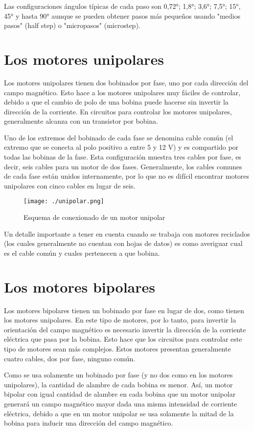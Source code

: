 \documentclass[final,narroweqnarray,inline,twoside]{ieee}
\begin{document}
Las configuraciones ángulos típicas de cada paso son 0,72°; 1,8°; 3,6°; 7,5°; 15°, 45° y hasta 90° aunque se pueden obtener
pasos más pequeños usando "medios pasos" (half step) o "micropasos" (microstep).

\section{Los motores unipolares}
Los motores unipolares tienen dos bobinados por fase, uno por cada dirección del campo magnético. Esto hace a los motores
unipolares muy fáciles de controlar, debido a que el cambio de polo de una bobina puede hacerse sin invertir la dirección de
la corriente. En circuitos para controlar los motores unipolares, generalmente alcanza con un transistor por bobina.

Uno de los extremos del bobinado de cada fase se denomina cable común (el extremo que se conecta al
polo positivo a entre 5 y 12 V) y es compartido por todas las bobinas de la fase. Esta configuración muestra tres cables por
fase, es decir, seis cables para un motor de dos fases. Generalmente, los cables comunes de cada fase están unidos
internamente, por lo que no es difícil encontrar motores unipolares con cinco cables en lugar de seis.
\begin{figure}[h]
 \centering
 \texttt{[image: ./unipolar.png]}
 \caption{Esquema de conexionado de un motor unipolar}
 \label{fig: Esquema de conexionado de un motor unipolar}
\end{figure}

Un detalle importante a tener en cuenta cuando se trabaja con motores reciclados (los cuales generalmente no cuentan con
hojas de datos) es como averiguar cual es el cable común y cuales pertenecen a que bobina.

\section{Los motores bipolares}
Los motores bipolares tienen un bobinado por fase en lugar de dos, como tienen los motores unipolares. En este tipo de
motores, por lo tanto, para invertir la orientación del campo magnético es necesario invertir la dirección de la corriente
eléctrica que pasa por la bobina. Esto hace que los circuitos para controlar este tipo de motores sean más complejos. Estos
motores presentan generalmente cuatro cables, dos por fase, ninguno común.

Como se usa solamente un bobinado por fase (y no dos como en los motores unipolares), la cantidad de alambre de cada bobina
es menor. Así, un motor bipolar con igual cantidad de alambre en cada bobina que un motor unipolar generará un campo
magnético mayor dada una misma intensidad de corriente eléctrica, debido a que en un motor unipolar se usa solamente la mitad
de la bobina para inducir una dirección del campo magnético.
\end{document}
